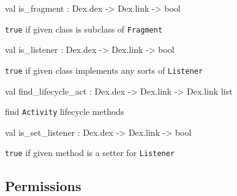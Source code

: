 \documentclass[11pt]{article}
\begin{document}
\label{val:Android.is-underscorefragment}\begin{ocamldoccode}
val is_fragment : Dex.dex -> Dex.link -> bool
\end{ocamldoccode}
\begin{ocamldocdescription}
{\tt{true}} if given class is subclass of {\tt{Fragment}}


\end{ocamldocdescription}




\label{val:Android.is-underscorelistener}\begin{ocamldoccode}
val is_listener : Dex.dex -> Dex.link -> bool
\end{ocamldoccode}
\begin{ocamldocdescription}
{\tt{true}} if given class implements any sorts of {\tt{Listener}}


\end{ocamldocdescription}




\label{val:Android.find-underscorelifecycle-underscoreact}\begin{ocamldoccode}
val find_lifecycle_act : Dex.dex -> Dex.link -> Dex.link list
\end{ocamldoccode}
\begin{ocamldocdescription}
find {\tt{Activity}} lifecycle methods


\end{ocamldocdescription}




\label{val:Android.is-underscoreset-underscorelistener}\begin{ocamldoccode}
val is_set_listener : Dex.dex -> Dex.link -> bool
\end{ocamldoccode}
\begin{ocamldocdescription}
{\tt{true}} if given method is a setter for {\tt{Listener}}


\end{ocamldocdescription}




\subsection{Permissions}
\end{document}
